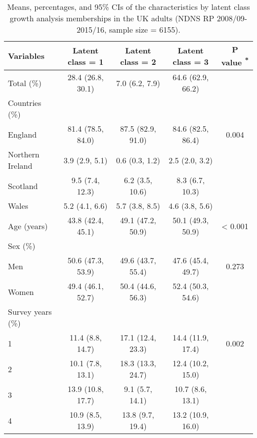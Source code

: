 \begin{table}
	
	\caption{\label{tab:unnamed-chunk-2}Means, percentages, and 95\% CIs of the characteristics by latent class growth analysis memberships in the UK adults (NDNS RP 2008/09-2015/16, sample size = 6155).}\vspace{-0.3cm}
	\centering
	\fontsize{9}{11}\selectfont
	\begin{tabular}[t]{lcccc}
		\hiderowcolors
		\toprule
		Variables & Latent class = 1 & Latent class = 2 & Latent class = 3 & P value \textsuperscript{*}\\
		\midrule
		\showrowcolors
		Total (\%) & 28.4 (26.8, 30.1) & 7.0 (6.2, 7.9) & 64.6 (62.9, 66.2) & \\
		Countries (\%) &  &  &  & \\
		\hspace{1em}England & 81.4 (78.5, 84.0) & 87.5 (82.9, 91.0) & 84.6 (82.5, 86.4) & 0.004\\
		\hspace{1em}Northern Ireland & 3.9 (2.9, 5.1) & 0.6 (0.3, 1.2) & 2.5 (2.0, 3.2) & \\
		\hspace{1em}Scotland & 9.5 (7.4, 12.3) & 6.2 (3.5, 10.6) & 8.3 (6.7, 10.3) & \\
		\hspace{1em}Wales & 5.2 (4.1, 6.6) & 5.7 (3.8, 8.5) & 4.6 (3.8, 5.6) & \\
		Age (years) & 43.8 (42.4, 45.1) & 49.1 (47.2, 50.9) & 50.1 (49.3, 50.9) & < 0.001\\
		Sex (\%) &  &  &  & \\
		\hspace{1em}Men & 50.6 (47.3, 53.9) & 49.6 (43.7, 55.4) & 47.6 (45.4, 49.7) & 0.273\\
		\hspace{1em}Women & 49.4 (46.1, 52.7) & 50.4 (44.6, 56.3) & 52.4 (50.3, 54.6) & \\
		Survey years (\%) &  &  &  & \\
		\hspace{1em}1 & 11.4 (8.8, 14.7) & 17.1 (12.4, 23.3) & 14.4 (11.9, 17.4) & 0.002\\
		\hspace{1em}2 & 10.1 (7.8, 13.1) & 18.3 (13.3, 24.7) & 12.4 (10.2, 15.0) & \\
		\hspace{1em}3 & 13.9 (10.8, 17.7) & 9.1 (5.7, 14.1) & 10.7 (8.6, 13.1) & \\
		\hspace{1em}4 & 10.9 (8.5, 13.9) & 13.8 (9.7, 19.4) & 13.2 (10.9, 16.0) & \\

\end{tabular}
\end{table}
